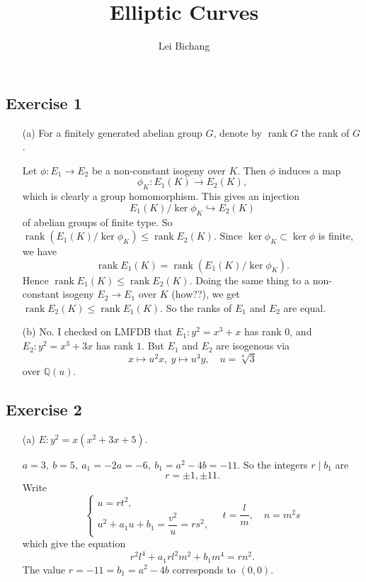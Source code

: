 \documentclass{article}
\title{Elliptic Curves}
\author{Lei Bichang}
\theoremstyle{definition}
\theoremstyle{remark}
\newcommand{\Q}{\mathbb{Q}}
\DeclareMathOperator{\rank}{rank} %
\begin{document}
\maketitle

\subsection*{Exercise 1}
\begin{enumerate}
\item [(a)] 
For a finitely generated abelian group $G$,
denote by $\rank G$ the rank of $G$.

Let $\phi : E_1\to E_2$ be a non-constant isogeny over $K$.
Then $\phi$ induces a map
\[\phi_K : E_1(K)\to E_2(K),\]
which is clearly a group homomorphism.
This gives an injection \[E_1(K)/\ker\phi_K\hookrightarrow E_2(K)\] of abelian groups of finite type.
So $\rank (E_1(K)/\ker\phi_K)\le \rank E_2(K)$.
Since $\ker\phi_K \subset \ker\phi$ is finite,
we have \[\rank E_1(K) = \rank (E_1(K)/\ker\phi_K).\]
Hence $\rank E_1(K)\le \rank E_2(K)$.
Doing the same thing to a non-constant isogeny $E_2\to E_1$ over $K$ (how??),
we get $\rank E_2(K)\le \rank E_1(K)$.
So the ranks of $E_1$ and $E_2$ are equal.
\item [(b)]
No.
I checked on LMFDB that $E_1 : y^2 = x^3 + x$ has rank $0$, and $E_2 : y^2 = x^3 + 3x$ has rank $1$.
But $E_1$ and $E_2$ are isogenous via \[x\mapsto u^{2}x,\ y\mapsto u^3y,\quad u = \sqrt[4]{3}\]
over $\Q(u)$.

\end{enumerate}

\subsection*{Exercise 2}
\begin{enumerate}
\item [(a)] $E : y^2 = x(x^2 + 3x + 5)$.\par
$a = 3,\ b = 5,\ a_1 = -2a = -6,\ b_1 = a^2-4b = -11$.
So the integers $r\mid b_1$ are \[r = \pm 1, \pm 11.\]
Write \[\begin{cases}
    u = rt^2,\\  u^2 + a_1u + b_1 = \dfrac{v^2}{u} = rs^2,
\end{cases}\quad t = \frac{l}{m},\quad n = m^2s \]
which give the equation\begin{equation}\label{eq: the eq to find E(Q)/2E(Q)}
    r^2l^4 + a_1rl^2m^2 + b_1m^4 = rn^2.
\end{equation}
The value $r = -11 = b_1 = a^2 - 4b$ corresponds to $(0, 0)$.




\end{enumerate}
\end{document}
